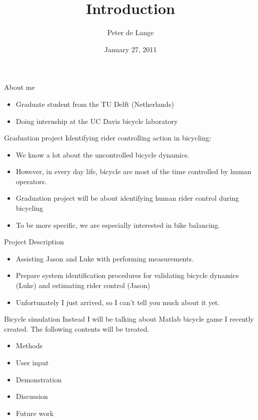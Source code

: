 \documentclass{beamer}
\title{Introduction}
\author{Peter de Lange}
\institute{UC DAVIS}
\date{January 27, 2011}
\begin{document}
\begin{frame}
\titlepage
\end{frame}

\begin{frame}{About me}
		\begin{itemize}
		\item Graduate student from the TU Delft (Netherlands)
		\item Doing internship at the UC Davis bicycle laboratory
		\end{itemize}
\end{frame}

\begin{frame}{Graduation project}
Identifying rider controlling action in bicycling:
		\begin{itemize}
		\item We know a lot about the uncontrolled bicycle dynamics.
		\item However, in every day life, bicycle are most of the time controlled by human operators.
		\item Graduation project will be about identifying human rider control during bicycling
		\item To be more specific, we are especially interested in bike balancing.
	 \end{itemize}
\end{frame}

\begin{frame}{Project Description}
		\begin{itemize}
		\item Assisting Jason and Luke with performing measurements.
		\item Prepare system identification procedures for validating bicycle dynamics (Luke) and estimating rider control (Jason)
		\item Unfortunately I just arrived, so I can't tell you much about it yet.
		\end{itemize}
\end{frame}

\begin{frame}{Bicycle simulation}
Instead I will be talking about Matlab bicycle game I recently created. The following contents will be treated. 
		\begin{itemize}
		\item Methods
		\item User input
		\item Demonstration
		\item Discussion
		\item Future work
		\end{itemize}
\end{frame}
\end{document}
